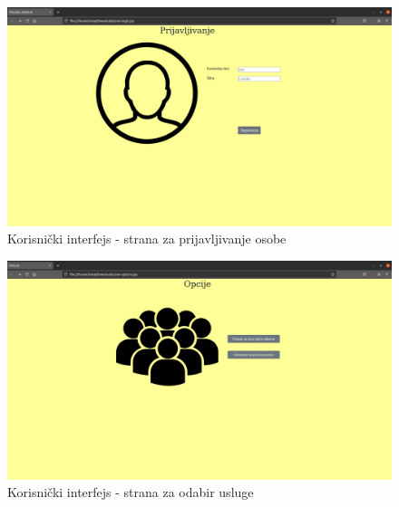 \documentclass[titlepage]{article}
\begin{document}
\begin{figure}[H]
\centering
\includegraphics[scale=0.23]{logovanje}
\caption{Korisni\v{c}ki interfejs - strana za prijavljivanje osobe}
\label{slk:komponente}
\end{figure}

\begin{figure}[H]
\centering
\includegraphics[scale=0.23]{opcije}
\caption{Korisni\v{c}ki interfejs - strana za odabir usluge}
\label{slk:komponente}
\end{figure}
\end{document}
